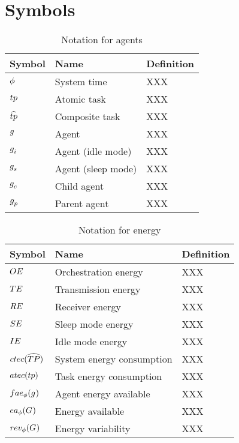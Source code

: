\section{Symbols}

\begin{table}[pos=htp]
	\begin{tabular}{|p{}|p{}|p{}|}
		\hline
		Symbol & Name & Definition \\
		\hline
		$\phi$ & System time & XXX \\
		$\varAtomicTask{}{}$ & Atomic task & XXX \\
		$\varCompositeTask{}{}$ & Composite task & XXX \\
		$g_{}^{}$ & Agent & XXX \\
		$g_{i}^{}$ & Agent (idle mode) & XXX \\
		$g_{s}^{}$ & Agent (sleep mode) & XXX \\
		$g_{c}^{}$ & Child agent & XXX \\
		$g_{p}^{}$ & Parent agent & XXX \\
		\hline
	\end{tabular}
	\caption{Notation for agents}
\end{table}

\begin{table}[pos=htp]
	\begin{tabular}{|p{}|p{}|p{}|}
		\hline
		Symbol & Name & Definition \\
		\hline
		$OE$ & Orchestration energy & XXX \\
		$TE$ & Transmission energy & XXX \\
		$RE$ & Receiver energy & XXX \\
		$SE$ & Sleep mode energy & XXX \\
		$IE$ & Idle mode energy & XXX \\
		$\functionSystemEnergyConsumption{}{}$ & System energy consumption& XXX \\
		$\functionTaskEnergyConsumption{}{}$ & Task energy consumption & XXX \\
		$\functionAgentEnergyAvailable{}{}$ & Agent energy available & XXX \\
		$\functionEnergyAvailable{}{}$ & Energy available & XXX \\
		$\functionEnergyVariability{}{}$ & Energy variability& XXX \\
		\hline
	\end{tabular}
	\caption{Notation for energy}
\end{table}

